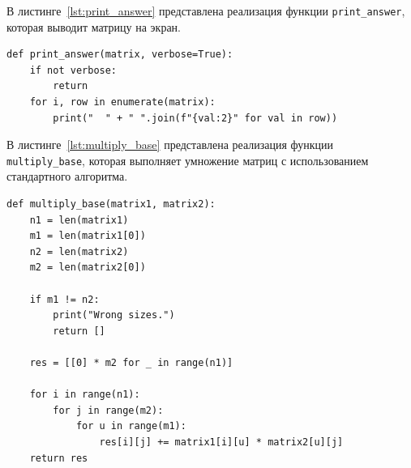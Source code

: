 \documentclass[a4paper, 12pt]{extreport}
\begin{document}
В листинге~\ref{lst:print_answer} представлена реализация функции \texttt{print\_answer}, которая выводит матрицу на экран.
\begin{center}
\captionsetup{justification=raggedright,singlelinecheck=off}
\begin{lstlisting}
def print_answer(matrix, verbose=True):
    if not verbose:
        return  
    for i, row in enumerate(matrix):
        print("  " + " ".join(f"{val:2}" for val in row)) 
\end{lstlisting}
\captionsetup{justification=centering, singlelinecheck=off}
\label{lst:print_answer}
\end{center}

В листинге~\ref{lst:multiply_base} представлена реализация функции \texttt{multiply\_base}, которая выполняет умножение матриц с использованием стандартного алгоритма.
\begin{center}
\captionsetup{justification=raggedright,singlelinecheck=off}
\begin{lstlisting}
def multiply_base(matrix1, matrix2):
    n1 = len(matrix1)
    m1 = len(matrix1[0])
    n2 = len(matrix2)
    m2 = len(matrix2[0])

    if m1 != n2:
        print("Wrong sizes.")
        return []
        
    res = [[0] * m2 for _ in range(n1)]
    
    for i in range(n1):
        for j in range(m2):
            for u in range(m1):
                res[i][j] += matrix1[i][u] * matrix2[u][j]
    return res
\end{lstlisting}
\captionsetup{justification=centering, singlelinecheck=off}
\label{lst:multiply_base}
\end{center}
\end{document}
